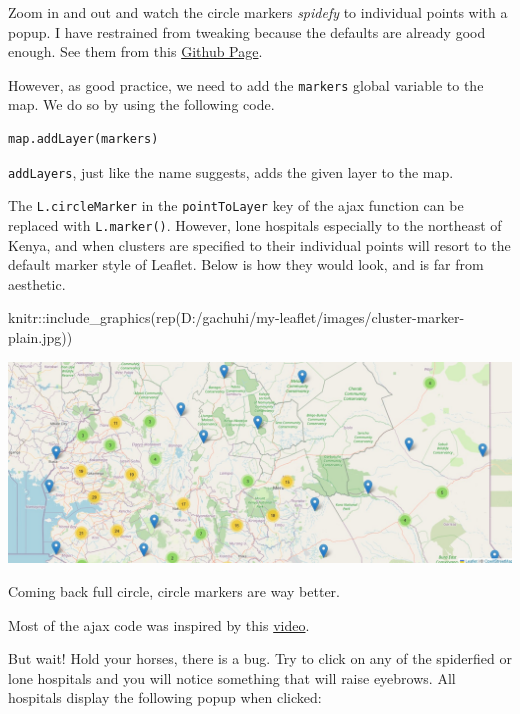 \documentclass[
]{book}
\newenvironment{Shaded}{\begin{snugshade}}{\end{snugshade}}
\newcommand{\FunctionTok}[1]{\textcolor[rgb]{0.00,0.00,0.00}{#1}}
\newcommand{\NormalTok}[1]{#1}
\newcommand{\SpecialCharTok}[1]{\textcolor[rgb]{0.00,0.00,0.00}{#1}}
\newcommand{\StringTok}[1]{\textcolor[rgb]{0.31,0.60,0.02}{#1}}
\begin{document}
Zoom in and out and watch the circle markers \emph{spidefy} to individual points with a popup. I have restrained from tweaking because the defaults are already good enough. See them from this \href{https://github.com/Leaflet/Leaflet.markercluster}{Github Page}.

However, as good practice, we need to add the \texttt{markers} global variable to the map. We do so by using the following code.

\begin{verbatim}
map.addLayer(markers)
\end{verbatim}

\texttt{addLayers}, just like the name suggests, adds the given layer to the map.

The \texttt{L.circleMarker} in the \texttt{pointToLayer} key of the ajax function can be replaced with \texttt{L.marker()}. However, lone hospitals especially to the northeast of Kenya, and when clusters are specified to their individual points will resort to the default marker style of Leaflet. Below is how they would look, and is far from aesthetic.

\begin{Shaded}
\begin{Highlighting}[]
\NormalTok{knitr}\SpecialCharTok{::}\FunctionTok{include\_graphics}\NormalTok{(}\FunctionTok{rep}\NormalTok{(}\StringTok{\textquotesingle{}D:/gachuhi/my{-}leaflet/images/cluster{-}marker{-}plain.jpg\textquotesingle{}}\NormalTok{))}
\end{Highlighting}
\end{Shaded}

\includegraphics[width=25.17in]{../images/cluster-marker-plain}

Coming back full circle, circle markers are way better.

Most of the ajax code was inspired by this \href{https://www.youtube.com/watch?v=R-V7XFUbrkw\&t=625s}{video}.

But wait! Hold your horses, there is a bug. Try to click on any of the spiderfied or lone hospitals and you will notice something that will raise eyebrows. All hospitals display the following popup when clicked:
\end{document}
